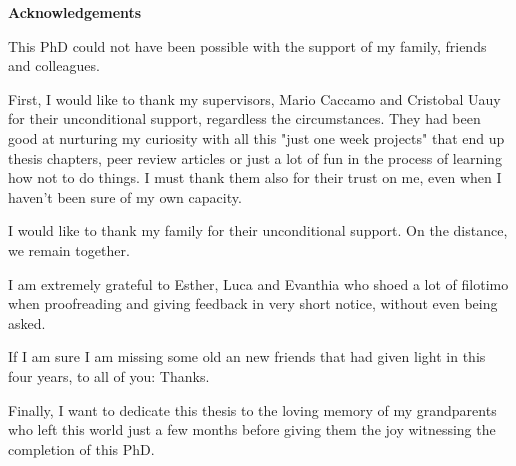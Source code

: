 \thispagestyle{empty}
\LARGE
\textbf{Acknowledgements} 
 \\
\normalsize



This PhD could not have been possible with the support of my family, friends and colleagues. 

First, I would like to thank my supervisors, Mario Caccamo and Cristobal Uauy for their unconditional support, regardless the circumstances. 
They had been good at nurturing my curiosity with all this "just one week projects" that end up thesis chapters, peer review articles or just a lot of fun in the process of learning how not to do things. 
I must thank them also for their trust on me, even when I haven't been sure of my own capacity.

I would like to thank my family for their unconditional support. 
On the distance, we remain together. 

I am extremely grateful to Esther, Luca and Evanthia who shoed a lot of filotimo when proofreading and giving feedback in very short notice, without even being asked. 

If I am sure I am missing some old an new friends that had given light in this four years, to all of you: Thanks. 

Finally, I want to dedicate this thesis to the loving memory of my grandparents who left this world just a few months before giving them the joy witnessing the completion of this PhD. 


